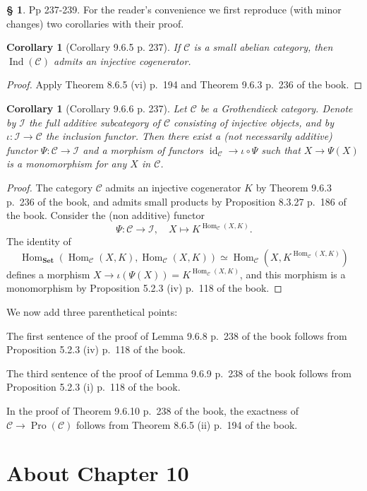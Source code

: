 \documentclass[12pt]{article}
\newtheorem{cor}[thm]{Corollary}
\theoremstyle{remark}
\theoremstyle{definition}
\newtheorem{s}[thm]{\S}
\newcommand{\cc}{\mathcal}
\newcommand{\oo}{\operatorname}
\newcommand{\C}{\mathcal C}
\newcommand{\Set}{\mathbf{Set}}
\DeclareMathOperator{\id}{id}
\DeclareMathOperator{\Hom}{Hom}
\DeclareMathOperator{\Ind}{Ind}
\begin{document}
\begin{s}
Pp 237-239. For the reader's convenience we first reproduce (with minor changes) two corollaries with their proof. 

\begin{cor}[Corollary 9.6.5 p. 237]
If $\C$ is a small abelian category, then $\Ind(\C)$ admits an injective cogenerator.
\end{cor}

\begin{proof}
Apply Theorem 8.6.5 (vi) p.~194 and Theorem 9.6.3 p.~236 of the book.
\end{proof}

\begin{cor}[Corollary 9.6.6 p. 237]
Let $\C$ be a Grothendieck category. Denote by $\cc I$ the full additive subcategory of $\C$ consisting of injective objects, and by $\iota:\cc I\to\C$ the inclusion functor. Then there exist a (not necessarily additive) functor $\Psi:\C\to\cc I$ and a morphism of functors $\id_\C\to\iota\circ\Psi$ such that $X\to\Psi(X)$ is a monomorphism for any $X$ in $\C$.
\end{cor}

\begin{proof}
The category $\C$ admits an injective cogenerator $K$ by Theorem 9.6.3 p.~236 of the book, and admits small products by Proposition 8.3.27 p.~186 of the book. Consider the (non additive) functor 
$$
\Psi:\C\to\cc I,\quad X\mapsto K^{\Hom_\C(X,K)}.
$$ 
The identity of 
$$
\Hom_{\Set}(\Hom_\C(X,K),\Hom_\C(X,K))\simeq\Hom_\C(X,K^{\Hom_\C(X,K)})
$$ 
defines a morphism $X\to\iota(\Psi(X))=K^{\Hom_\C(X,K)}$, and this morphism is a monomorphism by Proposition 5.2.3 (iv) p.~118 of the book. 
\end{proof}

We now add three parenthetical points: 

The first sentence of the proof of Lemma 9.6.8 p.~238 of the book follows from Proposition 5.2.3 (iv) p.~118 of the book. 

The third sentence of the proof of Lemma 9.6.9 p.~238 of the book follows from Proposition 5.2.3 (i) p.~118 of the book. 

In the proof of Theorem 9.6.10 p.~238 of the book, the exactness of $\C\to\oo{Pro}(\C)$ follows from Theorem 8.6.5 (ii) p.~194 of the book.
\end{s}


\section{About Chapter 10}
\end{document}
